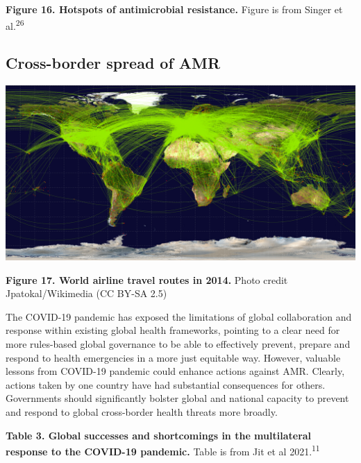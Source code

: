 \documentclass[
  11pt,
  paper=a4,
  ,captions=tableheading
]{scrartcl}
\begin{document}
\textbf{Figure 16. Hotspots of antimicrobial resistance.} Figure is from
Singer et al.\textsuperscript{26}

\newpage

\hypertarget{cross-border-spread-of-amr}{%
\subsection*{Cross-border spread of
AMR}\label{cross-border-spread-of-amr}}

\includegraphics[width=6.25in,height=\textheight]{images/worldairlineroute2014.png}

\textbf{Figure 17. World airline travel routes in 2014.} Photo credit
Jpatokal/Wikimedia (CC BY-SA 2.5)

The COVID-19 pandemic has exposed the limitations of global
collaboration and response within existing global health frameworks,
pointing to a clear need for more rules-based global governance to be
able to effectively prevent, prepare and respond to health emergencies
in a more just equitable way. However, valuable lessons from COVID-19
pandemic could enhance actions against AMR. Clearly, actions taken by
one country have had substantial consequences for others. Governments
should significantly bolster global and national capacity to prevent and
respond to global cross-border health threats more broadly.

\textbf{Table 3. Global successes and shortcomings in the multilateral
response to the COVID-19 pandemic.} Table is from Jit et al
2021.\textsuperscript{11}
\end{document}

